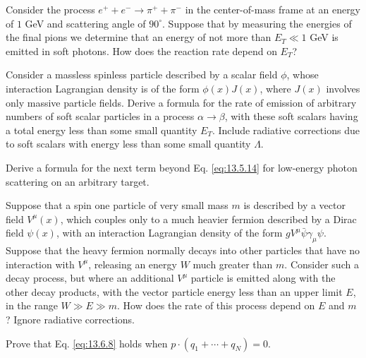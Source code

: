 
\begin{enumerate}
 Consider the process $e^+ + e^- \to \pi^+ + \pi^-$ in the center-of-mass
frame at an energy of $1$ GeV and scattering angle of $90^\circ$. Suppose that
by measuring the energies of the final pions we determine that an energy of not
more than $E_T \ll 1$ GeV is emitted in soft photons. How does the reaction rate
depend on $E_T$?

 Consider a massless spinless particle described by a scalar field $\phi$,
whose interaction Lagrangian density is of the form $\phi(x)J(x)$, where $J(x)$
involves only massive particle fields. Derive a formula for the rate of emission
of arbitrary numbers of soft scalar particles in a process $\alpha\to\beta$,
with these soft scalars having a total energy less than some small quantity
$E_T$. Include radiative corrections due to soft scalars with energy less than
some small quantity $\Lambda$.

 Derive a formula for the next term beyond Eq.
\eqref{eq:13.5.14} for
low-energy photon scattering on an arbitrary target.

 Suppose that a spin one particle of very small mass $m$ is described by a
vector field $V^\mu(x)$, which couples only to a much heavier fermion described
by a Dirac field $\psi(x)$, with an interaction Lagrangian density of the form
$g V^\mu \bar\psi\gamma_\mu\psi$. Suppose that the heavy fermion normally decays
into other particles that have no interaction with $V^\mu$, releasing an energy
$W$ much greater than $m$. Consider such a decay process, but where an
additional $V^\mu$ particle is emitted along with the other decay products,
with the vector particle energy less than an upper limit $E$, in the range
$W\gg E\gg m$. How does the rate of this process depend on $E$ and $m$? Ignore
radiative corrections.

 Prove that Eq. \eqref{eq:13.6.8} holds when
$p\cdot(q_1+\cdots+q_N)=0$.
\end{enumerate}
